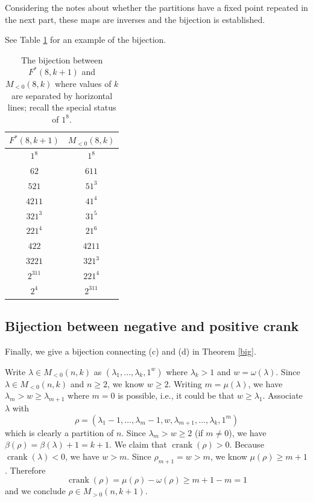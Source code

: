 \documentclass{amsart}
\theoremstyle{theorem}
\theoremstyle{definition}
\DeclareMathOperator{\ck}{crank}
\begin{document}
Considering the notes about whether the partitions have a fixed point repeated in the next part, these maps are inverses and the bijection is established.

See Table \ref{tab:bc} for an example of the bijection.

\begin{table}[t]
\renewcommand{\arraystretch}{1.1}
\caption{The bijection between $F^*(8,k+1)$ and $M_{<0}(8,k)$ where values of $k$ are separated by horizontal lines; recall the special status of $1^8$.} \label{tab:bc}
\begin{tabular}{c|c}
$F^*(8,k+1)$ & $M_{<0}(8,k)$ \\ \hline \hline
$1^8$ & $1^8$ \\ \hline
$62$ & $611$ \\
$521$ & $51^3$ \\
$4211$ & $41^4$ \\
$321^3$ & $31^5$ \\
$221^4$ & $21^6$ \\ \hline
$422$ & $4211$ \\
$3221$ & $321^3$ \\
$2^311$ & $221^4$ \\ \hline
$2^4$ & $2^311$
\end{tabular}
\end{table}

\subsection{Bijection between negative and positive crank} \label{negposcrank}

Finally, we give a bijection connecting (c) and (d) in Theorem \ref{big}.

Write $\lambda \in M_{<0}(n,k)$ as $(\lambda_1, \ldots, \lambda_k, 1^w)$ where $\lambda_k > 1$ and $w = \omega(\lambda)$.  Since $\lambda \in M_{<0}(n,k)$ and $n \ge 2$, we know $w \ge 2$.  Writing $m = \mu(\lambda)$, we have $\lambda_m > w \ge \lambda_{m+1}$ where $m = 0$ is possible, i.e., it could be that $w \ge \lambda_1$.  Associate $\lambda$ with
\[ \rho = (\lambda_1 - 1, \ldots, \lambda_m - 1, w, \lambda_{m+1}, \ldots, \lambda_k, 1^m)\]
which is clearly a partition of $n$.  Since $\lambda_m > w \ge 2$ (if $m \ne 0$), we have $\beta(\rho) = \beta(\lambda) + 1 = k+1$.  We claim that $\ck(\rho) > 0$.  Because $\ck(\lambda) < 0$, we have $w > m$.  Since $\rho_{m+1} = w > m$, we know $\mu(\rho) \ge m+1$.  Therefore
\[\ck(\rho) = \mu(\rho) - \omega(\rho) \ge m+1 - m = 1\]
and we conclude $\rho \in M_{>0}(n,k+1)$.
\end{document}
